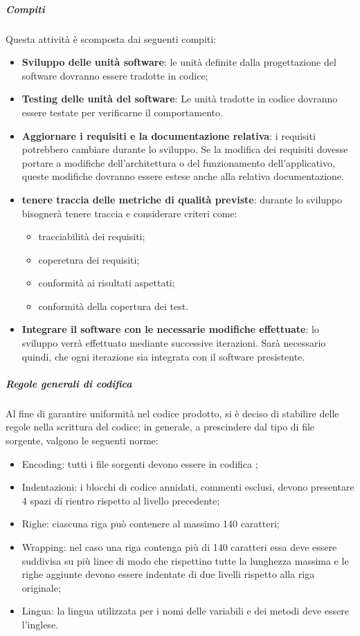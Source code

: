 \subparagraph{Compiti}
\label{par:codifica:Compiti}
Questa attività è scomposta dai seguenti compiti:
\begin{itemize}
    \item \textbf{Sviluppo delle unità software}: le unità definite dalla progettazione del software dovranno essere tradotte in codice;
    \item \textbf{Testing delle unità del software}: Le unità tradotte in codice dovranno essere testate per verificarne il comportamento.
    \item \textbf{Aggiornare i requisiti e la documentazione relativa}: i requisiti potrebbero cambiare durante lo sviluppo. Se la modifica dei requisiti dovesse portare a modifiche dell'architettura o del funzionamento dell'applicativo, queste modifiche dovranno essere estese anche alla relativa documentazione.
    \item \textbf{tenere traccia delle metriche di qualità previste}: durante lo sviluppo bisognerà tenere traccia e considerare criteri come:
        \begin{itemize}
            \item tracciabilità dei requisiti;
            \item coperetura dei requisiti;
            \item conformità ai risultati aspettati;
            \item conformità della copertura dei test.
        \end{itemize}
    \item \textbf{Integrare il software con le necessarie modifiche effettuate}: lo sviluppo verrà effettuato mediante successive iterazioni. Sarà necessario quindi, che ogni iterazione sia integrata con il software presistente.
\end{itemize}

\subparagraph{Regole generali di codifica}
\label{par:stile_codifica}

Al fine di garantire uniformità nel codice prodotto, si è deciso di stabilire delle regole nella scrittura del codice; in generale, a
prescindere dal tipo di file sorgente, valgono le seguenti norme:
\begin{itemize}
	\item Encoding: tutti i file sorgenti devono essere in codifica ;
    \item Indentazioni: i blocchi di codice annidati, commenti esclusi, devono presentare 4 spazi di rientro rispetto al livello precedente;
    \item Righe: ciascuna riga può contenere al massimo 140 caratteri;
    \item Wrapping: nel caso una riga contenga più di 140 caratteri essa deve essere suddivisa su più linee di modo che rispettino tutte
    	la lunghezza massima e le righe aggiunte devono essere indentate di due livelli rispetto alla riga originale;
    \item Lingua: la lingua utilizzata per i nomi delle variabili e dei metodi deve essere l'inglese.
\end{itemize}



